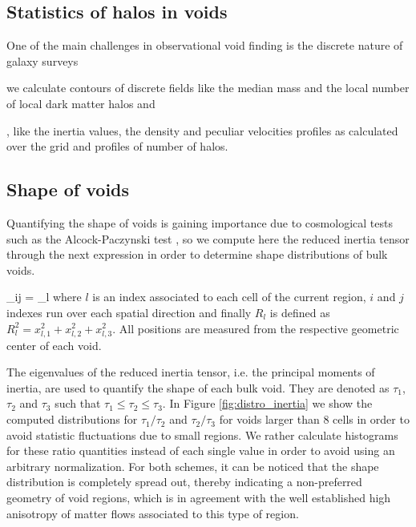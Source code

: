 \documentclass[a4,useAMS,usenatbib,usegraphicx]{latex/mn2e}
\begin{document}
\subsection{Statistics of halos in voids}
\label{subsec:shape_voids}


One of the main challenges in observational void finding is the discrete 
nature of galaxy surveys

 we calculate contours of discrete fields like the median mass and 
the local number of local dark matter halos and

, like the inertia values,
the density and peculiar velocities profiles as calculated over the grid 
and profiles of number of halos.


\subsection{Shape of voids}
\label{subsec:shape_voids}


Quantifying the shape of voids is gaining importance due to cosmological 
tests such as the Alcock-Paczynski test \SRKED{[Sutter, et.al (2012)]}, so 
we compute here the reduced inertia tensor through the next expression in 
order to determine shape distributions of bulk voids.


{ \tau_{ij} = \sum_l  }
where $l$ is an index associated to each cell of the current region, 
$i$ and $j$ indexes run over each spatial direction and finally 
$R_l$ is defined as $R_l^2 = x_{l,1}^2 + x_{l,2}^2 + x_{l,3}^2$. All 
positions are measured from the respective geometric center of each void.


The eigenvalues of the reduced inertia tensor, i.e. the principal moments
of inertia, are used to quantify the shape of each bulk void. They are 
denoted as $\tau_1$, $\tau_2$ and $\tau_3$ such that $\tau_1 \leq \tau_2
\leq \tau_3$. In Figure \ref{fig:distro_inertia} we show the computed
distributions for $\tau_1/\tau_2$ and $\tau_2/\tau_3$ for voids larger 
than 8 cells in order to avoid statistic fluctuations due to small regions.
We rather calculate histograms for these ratio quantities instead of each 
single value in order to avoid using an arbitrary normalization. For both 
schemes, it can be noticed that the shape distribution is completely 
spread out, thereby indicating a non-preferred geometry of void regions, 
which is in agreement with the well established high anisotropy of matter 
flows associated to this type of region. 
\end{document}
